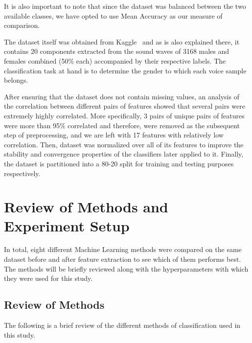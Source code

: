 \documentclass[journal,onecolumn]{IEEEtran}
\begin{document}
It is also important to note that since the dataset was balanced between the two available classes,
we have opted to use Mean Accuracy as our measure of comparison.

The dataset itself was obtained from Kaggle~\cite{dataset} and as is also explained there, it contains 20
components extracted from the sound waves of 3168 males and females combined (50\% each) 
accompanied by their respective labels. The classification task at hand is to determine the 
gender to which each voice sample belongs.

After ensuring that the dataset does not contain missing values, an analysis of the correlation between different pairs of features showed that several pairs were extremely highly
correlated. More specifically, 3 pairs of unique pairs of features were more than 95\% correlated and therefore, 
were removed as the subsequent step of preprocessing, and we are left with 17 features with relatively low correlation. Then,
dataset was normalized over all of its features to improve the stability and convergence properties of the classifiers later applied to it.
Finally, the dataset is partitioned into a 80-20 split for training and testing purposes respectively. 
\section{Review of Methods and Experiment Setup}
In total, eight different Machine Learning methods were compared on the same dataset before and after
feature extraction to see which of them performs best. The methods will be briefly reviewed along with the
hyperparameters with which they were used for this study.
\subsection{Review of Methods}
The following is a brief review of the different methods of classification used in this study.
\end{document}
